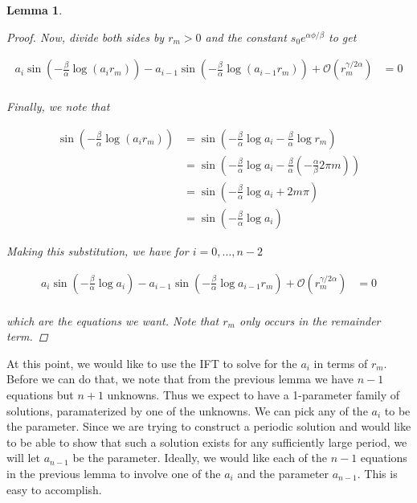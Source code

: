 \documentclass[12pt]{article}
\newtheorem{lemma}{Lemma}
\begin{document}
\begin{lemma}
\begin{proof}
Now, divide both sides by $r_m > 0$ and the constant $s_0 e^{\alpha \phi / \beta }$ to get

\begin{align}\label{diff2}
a_i \sin \left( - \frac{\beta}{\alpha} \log (a_i r_m) \right) -  a_{i-1} \sin \left( - \frac{\beta}{\alpha} \log (a_{i-1} r_m) \right) + \mathcal{O}(r_m^{\gamma / 2 \alpha}) &= 0 \\
\end{align}

Finally, we note that

\begin{align*}
\sin \left( - \frac{\beta}{\alpha} \log (a_i r_m) \right)&=
\sin \left( - \frac{\beta}{\alpha} \log a_i - \frac{\beta}{\alpha} \log r_m  \right) \\
&= \sin \left( - \frac{\beta}{\alpha} \log a_i -\frac{\beta}{\alpha}\left( -\frac{\alpha}{\beta}2\pi m \right) \right) \\
&= \sin \left( - \frac{\beta}{\alpha} \log a_i + 2 m \pi \right) \\
&= \sin \left( - \frac{\beta}{\alpha} \log a_i \right) 
\end{align*}

Making this substitution, we have for $i = 0, \dots, n-2$

\begin{align}\label{diff3}
a_i \sin \left( - \frac{\beta}{\alpha} \log a_i \right) - a_{i-1} \sin \left( - \frac{\beta}{\alpha} \log a_{i-1} r_m \right) + \mathcal{O}(r_m^{\gamma / 2 \alpha}) &= 0 \\
\end{align}

which are the equations we want. Note that $r_m$ only occurs in the remainder term.

\end{proof}
\end{lemma}

At this point, we would like to use the IFT to solve for the $a_i$ in terms of $r_m$. Before we can do that, we note that from the previous lemma we have $n-1$ equations but $n+1$ unknowns. Thus we expect to have a 1-parameter family of solutions, paramaterized by one of the unknowns. We can pick any of the $a_i$ to be the parameter. Since we are trying to construct a periodic solution and would like to be able to show that such a solution exists for any sufficiently large period, we will let $a_{n-1}$ be the parameter. Ideally, we would like each of the $n-1$ equations in the previous lemma to involve one of the $a_i$ and the parameter $a_{n-1}$. This is easy to accomplish.
\end{document}
